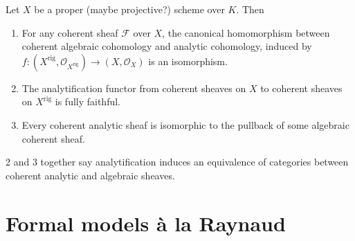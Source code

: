 \documentclass[a4paper]{article}
\newcommand{\sh}[1]{\mathcal{#1}} %
\begin{document}
\begin{theorem}
  Let \(X\) be a proper (maybe projective?) scheme over \(K\). Then
  \begin{enumerate}
  \item For any coherent sheaf \(\sh F\) over \(X\), the canonical homomorphism between coherent algebraic cohomology and analytic cohomology, induced by \(f: (X^{\mathrm{rig}}, \sh O_{X^{\mathrm{rig}}}) \to (X, \sh O_X)\) is an isomorphism.
  \item The analytification functor from coherent sheaves on \(X\) to coherent sheaves on \(X^{\mathrm{rig}}\) is fully faithful.
  \item Every coherent analytic sheaf is isomorphic to the pullback of some algebraic coherent sheaf.
  \end{enumerate}
\end{theorem}

2 and 3 together say analytification induces an equivalence of categories between coherent analytic and algebraic sheaves.

\section{Formal models à la Raynaud}
\end{document}
